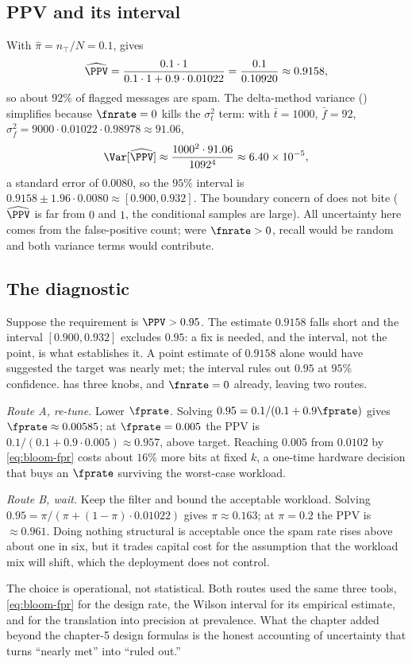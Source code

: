 \subsection*{PPV and its interval}

With $\hat\pi = n_\top/N = 0.1$,  gives
\[
  \widehat{\PPV} = \frac{0.1 \cdot 1}{0.1 \cdot 1 + 0.9 \cdot 0.01022}
  = \frac{0.1}{0.10920} \approx 0.9158,
\]
so about $92\%$ of flagged messages are spam. The delta-method variance
() simplifies because $\fnrate = 0$ kills the
$\sigma_t^2$ term: with $\bar t = 1000$, $\bar f = 92$, $\sigma_f^2 = 9000
\cdot 0.01022 \cdot 0.98978 \approx 91.06$,
\[
  \Var[\widehat{\PPV}] \approx \frac{1000^2 \cdot 91.06}{1092^4}
  \approx 6.40 \times 10^{-5},
\]
a standard error of $0.0080$, so the $95\%$ interval is $0.9158 \pm 1.96 \cdot
0.0080 \approx [0.900, 0.932]$. The boundary concern of
 does not bite ($\widehat{\PPV}$ is far from
$0$ and $1$, the conditional samples are large). All uncertainty here comes
from the false-positive count; were $\fnrate > 0$, recall would be random and
both variance terms would contribute.

\subsection*{The diagnostic}

Suppose the requirement is $\PPV > 0.95$. The estimate $0.9158$ falls short and
the interval $[0.900, 0.932]$ excludes $0.95$: a fix is needed, and the
interval, not the point, is what establishes it. A point estimate of $0.9158$
alone would have suggested the target was nearly met; the interval rules out
$0.95$ at $95\%$ confidence.  has three knobs, and $\fnrate = 0$
already, leaving two routes.

\emph{Route A, re-tune.} Lower $\fprate$. Solving $0.95 = 0.1/(0.1 + 0.9
\fprate)$ gives $\fprate \approx 0.00585$; at $\fprate = 0.005$ the PPV is
$0.1/(0.1 + 0.9 \cdot 0.005) \approx 0.957$, above target. Reaching $0.005$
from $0.0102$ by \eqref{eq:bloom-fpr} costs about $16\%$ more bits at fixed
$k$, a one-time hardware decision that buys an $\fprate$ surviving the
worst-case workload.

\emph{Route B, wait.} Keep the filter and bound the acceptable workload.
Solving $0.95 = \pi/(\pi + (1 - \pi) \cdot 0.01022)$ gives $\pi \approx 0.163$;
at $\pi = 0.2$ the PPV is $\approx 0.961$. Doing nothing structural is
acceptable once the spam rate rises above about one in six, but it trades
capital cost for the assumption that the workload mix will shift, which the
deployment does not control.

The choice is operational, not statistical. Both routes used the same three
tools, \eqref{eq:bloom-fpr} for the design rate, the Wilson interval for its
empirical estimate, and  for the translation into precision at
prevalence. What the chapter added beyond the chapter-5 design formulas is the
honest accounting of uncertainty that turns ``nearly met'' into ``ruled out.''
